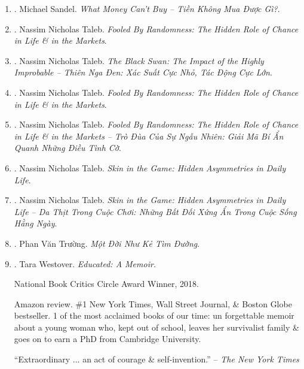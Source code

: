 \documentclass{article}
\begin{document}
\begin{enumerate}
	\item \cite{Sandel_money}. {\sc Michael Sandel}. {\it What Money Can't Buy -- Tiền Không Mua Được Gì?}.\hfill{\sf[done]}
	
	\item \cite{Taleb_randomness}. {\sc Nassim Nicholas Taleb}. {\it Fooled By Randomness: The Hidden Role of Chance in Life \& in the Markets}.\hfill{\sf[reading]}
	
	\item \cite{Taleb_black_swan_VN}. {\sc Nassim Nicholas Taleb}. {\it The Black Swan: The Impact of the Highly Improbable -- Thiên Nga Đen: Xác Suất Cực Nhỏ, Tác Động Cực Lớn}.\hfill{\sf[done]}
	
	\item \cite{Taleb_randomness}. {\sc Nassim Nicholas Taleb}. {\it Fooled By Randomness: The Hidden Role of Chance in Life \& in the Markets}.
	
	\item \cite{Taleb_randomness_VN}. {\sc Nassim Nicholas Taleb}. {\it Fooled By Randomness: The Hidden Role of Chance in Life \& in the Markets -- Trò Đùa Của Sự Ngẫu Nhiên: Giải Mã Bí Ẩn Quanh Những Điều Tình Cờ}.\hfill{\sf[done]}
	
	\item \cite{Taleb_skin_game}. {\sc Nassim Nicholas Taleb}. {\it Skin in the Game: Hidden Asymmetries in Daily Life}.
	
	\item \cite{Taleb_skin_game_VN}. {\sc Nassim Nicholas Taleb}. {\it Skin in the Game: Hidden Asymmetries in Daily Life -- Da Thịt Trong Cuộc Chơi: Những Bất Đối Xứng Ẩn Trong Cuộc Sống Hằng Ngày}.\hfill{\sf[done]}
	
	\item \cite{Truong_ke_tim_duong}. {\sc Phan Văn Trường}. {\it Một Đời Như Kẻ Tìm Đường}.\hfill{\sf[done]}
	
	\item \cite{Westover_educated}. {\sc Tara Westover}. {\it Educated: A Memoir.} {}
	
	National Book Critics Circle Award Winner, 2018.
	
	{\sf Amazon review.} \#1 New York Times, Wall Street Journal, \& Boston Globe bestseller. 1 of the most acclaimed books of our time: un forgettable memoir about a young woman who, kept out of school, leaves her survivalist family \& goes on to earn a PhD from Cambridge University.
	
	``Extraordinary $\ldots$ an act of courage \& self-invention.'' -- {\it The New York Times}
	

\end{enumerate}
\end{document}
